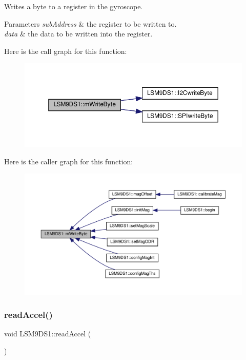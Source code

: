 Writes a byte to a register in the gyroscope. 


\begin{DoxyParams}{Parameters}
{\em sub\+Address} & the register to be written to. \\
\hline
{\em data} & the data to be written into the register. \\
\hline
\end{DoxyParams}
Here is the call graph for this function\+:
\nopagebreak
\begin{figure}[H]
\begin{center}
\leavevmode
\includegraphics[width=350pt]{classLSM9DS1_afc171c924102c97fa1d88fa7f48bd167_cgraph}
\end{center}
\end{figure}
Here is the caller graph for this function\+:
\nopagebreak
\begin{figure}[H]
\begin{center}
\leavevmode
\includegraphics[width=350pt]{classLSM9DS1_afc171c924102c97fa1d88fa7f48bd167_icgraph}
\end{center}
\end{figure}
\mbox{\label{classLSM9DS1_a9953684a1ff652a7d3a4d91e72bccaa1}} 
\subsubsection{\texorpdfstring{read\+Accel()}{readAccel()}\hspace{0.1cm}{\footnotesize\ttfamily [1/2]}}
{\footnotesize\ttfamily void L\+S\+M9\+D\+S1\+::read\+Accel (\begin{DoxyParamCaption}{ }\end{DoxyParamCaption})}



